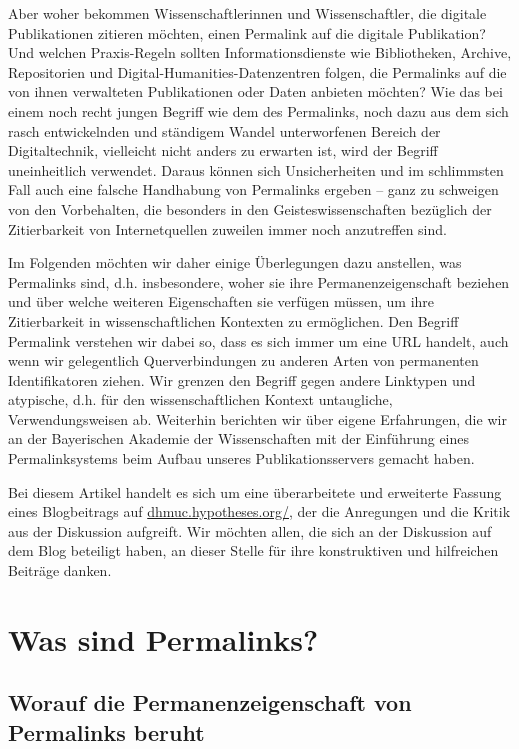 \documentclass[12pt, a4paper]{article}
\begin{document}
Aber woher bekommen Wissenschaftlerinnen und Wissenschaftler, die
digitale Publikationen zitieren möchten, einen Permalink auf die
digitale Publikation? Und welchen Praxis-Regeln sollten
Informationsdienste wie Bibliotheken, Archive, Repositorien und
Digital-Humanities-Datenzentren folgen, die Permalinks auf die von ihnen
verwalteten Publikationen oder Daten anbieten möchten? Wie das bei einem
noch recht jungen Begriff wie dem des Permalinks, noch dazu aus dem sich
rasch entwickelnden und ständigem Wandel unterworfenen Bereich der
Digitaltechnik, vielleicht nicht anders zu erwarten ist, wird der
Begriff uneinheitlich verwendet. Daraus können sich Unsicherheiten und
im schlimmsten Fall auch eine falsche Handhabung von Permalinks ergeben
-- ganz zu schweigen von den Vorbehalten, die besonders in den
Geisteswissenschaften bezüglich der Zitierbarkeit von Internetquellen
zuweilen immer noch anzutreffen sind.

Im Folgenden möchten wir daher einige Überlegungen dazu anstellen, was
Permalinks sind, d.h. insbesondere, woher sie ihre Permanenzeigenschaft
beziehen und über welche weiteren Eigenschaften sie verfügen müssen,
um ihre Zitierbarkeit in wissenschaftlichen Kontexten zu
ermöglichen. Den Begriff Permalink verstehen wir dabei so, dass es
sich immer um eine URL handelt, auch wenn wir gelegentlich
Querverbindungen zu anderen Arten von permanenten Identifikatoren
ziehen. Wir grenzen den Begriff gegen andere Linktypen und atypische,
d.h. für den wissenschaftlichen Kontext untaugliche, Verwendungsweisen
ab. Weiterhin berichten wir über eigene Erfahrungen, die wir an der
Bayerischen Akademie der Wissenschaften mit der Einführung eines
Permalinksystems beim Aufbau unseres Publikationsservers gemacht
haben.

Bei diesem Artikel handelt es sich um eine überarbeitete und
erweiterte Fassung eines Blogbeitrags auf
\href{https://dhmuc.hypotheses.org/1179}{dhmuc.\-hypotheses.\-org/},
der die Anregungen und die Kritik aus der Diskussion aufgreift. Wir
möchten allen, die sich an der Diskussion auf dem Blog beteiligt
haben, an dieser Stelle für ihre konstruktiven und hilfreichen
Beiträge danken.

\section{Was sind Permalinks?}
\label{was-sind-permalinks}

\subsection{Worauf die Permanenzeigenschaft von Permalinks
  beruht}
\label{worauf-die-permanenzeigenschaft-von-permalinks-beruht}
\end{document}

